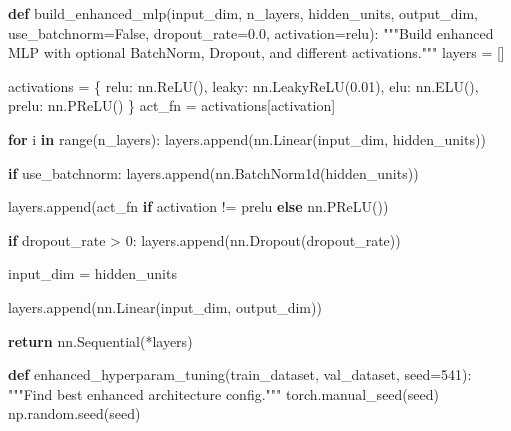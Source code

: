 \documentclass[
  letterpaper,
  DIV=11,
  numbers=noendperiod]{scrartcl}
\newenvironment{Shaded}{\begin{snugshade}}{\end{snugshade}}
\newcommand{\BuiltInTok}[1]{\textcolor[rgb]{0.00,0.23,0.31}{#1}}
\newcommand{\CommentTok}[1]{\textcolor[rgb]{0.37,0.37,0.37}{#1}}
\newcommand{\ControlFlowTok}[1]{\textcolor[rgb]{0.00,0.23,0.31}{\textbf{#1}}}
\newcommand{\DecValTok}[1]{\textcolor[rgb]{0.68,0.00,0.00}{#1}}
\newcommand{\FloatTok}[1]{\textcolor[rgb]{0.68,0.00,0.00}{#1}}
\newcommand{\KeywordTok}[1]{\textcolor[rgb]{0.00,0.23,0.31}{\textbf{#1}}}
\newcommand{\NormalTok}[1]{\textcolor[rgb]{0.00,0.23,0.31}{#1}}
\newcommand{\OperatorTok}[1]{\textcolor[rgb]{0.37,0.37,0.37}{#1}}
\newcommand{\StringTok}[1]{\textcolor[rgb]{0.13,0.47,0.30}{#1}}
\newcommand{\VariableTok}[1]{\textcolor[rgb]{0.07,0.07,0.07}{#1}}
\begin{document}
\begin{Shaded}
\begin{Highlighting}[]

\KeywordTok{def}\NormalTok{ build\_enhanced\_mlp(input\_dim, n\_layers, hidden\_units, output\_dim,}
\NormalTok{                       use\_batchnorm}\OperatorTok{=}\VariableTok{False}\NormalTok{, dropout\_rate}\OperatorTok{=}\FloatTok{0.0}\NormalTok{, activation}\OperatorTok{=}\StringTok{\textquotesingle{}relu\textquotesingle{}}\NormalTok{):}
    \CommentTok{"""Build enhanced MLP with optional BatchNorm, Dropout, and different activations."""}
\NormalTok{    layers }\OperatorTok{=}\NormalTok{ []}

\NormalTok{    activations }\OperatorTok{=}\NormalTok{ \{}
        \StringTok{\textquotesingle{}relu\textquotesingle{}}\NormalTok{: nn.ReLU(),}
        \StringTok{\textquotesingle{}leaky\textquotesingle{}}\NormalTok{: nn.LeakyReLU(}\FloatTok{0.01}\NormalTok{),}
        \StringTok{\textquotesingle{}elu\textquotesingle{}}\NormalTok{: nn.ELU(),}
        \StringTok{\textquotesingle{}prelu\textquotesingle{}}\NormalTok{: nn.PReLU()}
\NormalTok{    \}}
\NormalTok{    act\_fn }\OperatorTok{=}\NormalTok{ activations[activation]}

    \ControlFlowTok{for}\NormalTok{ i }\KeywordTok{in} \BuiltInTok{range}\NormalTok{(n\_layers):}
\NormalTok{        layers.append(nn.Linear(input\_dim, hidden\_units))}

        \ControlFlowTok{if}\NormalTok{ use\_batchnorm:}
\NormalTok{            layers.append(nn.BatchNorm1d(hidden\_units))}

\NormalTok{        layers.append(act\_fn }\ControlFlowTok{if}\NormalTok{ activation }\OperatorTok{!=} \StringTok{\textquotesingle{}prelu\textquotesingle{}} \ControlFlowTok{else}\NormalTok{ nn.PReLU())}

        \ControlFlowTok{if}\NormalTok{ dropout\_rate }\OperatorTok{\textgreater{}} \DecValTok{0}\NormalTok{:}
\NormalTok{            layers.append(nn.Dropout(dropout\_rate))}

\NormalTok{        input\_dim }\OperatorTok{=}\NormalTok{ hidden\_units}

\NormalTok{    layers.append(nn.Linear(input\_dim, output\_dim))}

    \ControlFlowTok{return}\NormalTok{ nn.Sequential(}\OperatorTok{*}\NormalTok{layers)}


\KeywordTok{def}\NormalTok{ enhanced\_hyperparam\_tuning(train\_dataset, val\_dataset, seed}\OperatorTok{=}\DecValTok{541}\NormalTok{):}
    \CommentTok{"""Find best enhanced architecture config."""}
\NormalTok{    torch.manual\_seed(seed)}
\NormalTok{    np.random.seed(seed)}


\end{Highlighting}
\end{Shaded}
\end{document}
